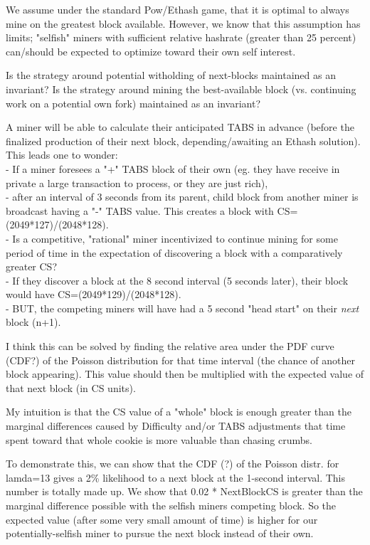 \documentclass[11pt]{article}
\theoremstyle{plain}
\begin{document}
{We assume under the standard Pow/Ethash game, that it is optimal to always mine
on the greatest block available.
However, we know that this assumption has limits; "selfish" miners with
sufficient relative hashrate (greater than 25 percent) can/should be expected
to optimize toward their own self interest.

Is the strategy around potential witholding of next-blocks maintained as an
invariant?
Is the strategy around mining the best-available block (vs. continuing work on
a potential own fork) maintained as an invariant?

A miner will be able to calculate their anticipated TABS in advance (before the
finalized production of their next block, depending/awaiting an Ethash
solution).
This leads one to wonder: \\
- If a miner foresees a "+" TABS block of their own (eg. they have receive in
private a large transaction to process, or they are just rich), \\
- after an interval of 3 seconds from its parent, child block from another
miner is broadcast having a "-" TABS value. This creates a block with
CS=(2049*127)/(2048*128). \\
- Is a competitive, "rational" miner incentivized to continue mining for some
period of time in the expectation of discovering a block with a comparatively
greater CS? \\
    - If they discover a block at the 8 second interval (5 seconds later),
their block would have CS=(2049*129)/(2048*128). \\
    - BUT, the competing miners will have had a 5 second "head start" on their
\textit{next} block (n+1).

I think this can be solved by finding the relative area under the PDF curve
(CDF?) of the Poisson distribution for that time interval (the chance of
another block appearing).
This value should then be multiplied with the expected value of that next block
(in CS units).

My intuition is that the CS value of a "whole" block is enough greater than the
marginal differences caused by Difficulty and/or TABS adjustments that time
spent toward that whole cookie is more valuable than chasing crumbs.

To demonstrate this, we can show that the CDF (?) of the Poisson distr. for
lamda=13 gives a 2\% likelihood to a next block at the 1-second interval. This
number is totally made up.
We show that 0.02 * NextBlockCS is greater than the marginal difference
possible with the selfish miners competing block.
So the expected value (after some very small amount of time) is higher for our
potentially-selfish miner to pursue the next block instead of their own.

}
\end{document}
